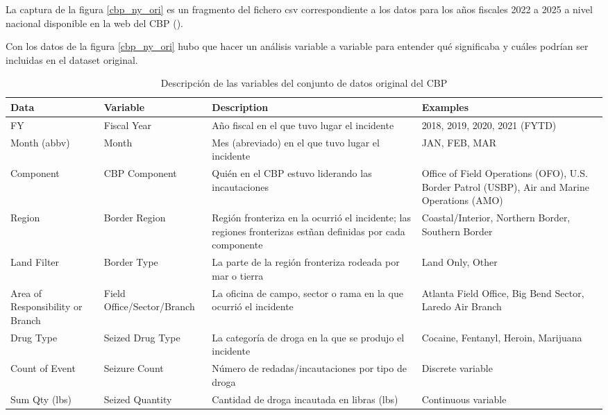 \documentclass[12pt]{article}
\begin{document}
		La captura de la figura \ref{cbp_ny_ori} es un fragmento del fichero csv correspondiente a los datos para los años fiscales 2022 a 2025 a nivel nacional disponible en la web del CBP (\cite{cbp2025drugseizures}).
		
		Con los datos de la figura \ref{cbp_ny_ori} hubo que hacer un análisis variable a variable para entender qué significaba y cuáles podrían ser incluidas en el dataset original.
		
		\begingroup
		\begin{table}[H]
			\centering
			\caption{\label{original_CBP}Descripción de las variables del conjunto de datos original del CBP}
			\label{tabla_variables}
			\begin{tabular}{|l|l|p{7cm}|p{4cm}|}
				\hline
				\textbf{Data} & \textbf{Variable} & \textbf{Description} & \textbf{Examples} \\
				\hline
				FY & Fiscal Year & Año fiscal en el que tuvo lugar el incidente & 2018, 2019, 2020, 2021 (FYTD) \\
				\hline
				Month (abbv) & Month & Mes (abreviado) en el que tuvo lugar el incidente & JAN, FEB, MAR \\
				\hline
				Component & CBP Component & Quién en el CBP estuvo liderando las incautaciones & Office of Field Operations (OFO), U.S. Border Patrol (USBP), Air and Marine Operations (AMO) \\
				\hline
				Region & Border Region & Región fronteriza en la ocurrió el incidente; las regiones fronterizas estñan definidas por cada componente & Coastal/Interior, Northern Border, Southern Border \\
				\hline
				Land Filter & Border Type & La parte de la región fronteriza rodeada por mar o tierra & Land Only, Other \\
				\hline
				Area of Responsibility or Branch & Field Office/Sector/Branch & La oficina de campo, sector o rama en la que ocurrió el incidente & Atlanta Field Office, Big Bend Sector, Laredo Air Branch \\
				\hline
				Drug Type & Seized Drug Type & La categoría de droga en la que se produjo el incidente & Cocaine, Fentanyl, Heroin, Marijuana \\
				\hline
				Count of Event & Seizure Count & Número de redadas/incautaciones por tipo de droga & Discrete variable \\
				\hline
				Sum Qty (lbs) & Seized Quantity & Cantidad de droga incautada en libras (lbs) & Continuous variable \\
				\hline
			\end{tabular}
		\end{table}
		\endgroup
		
\end{document}
